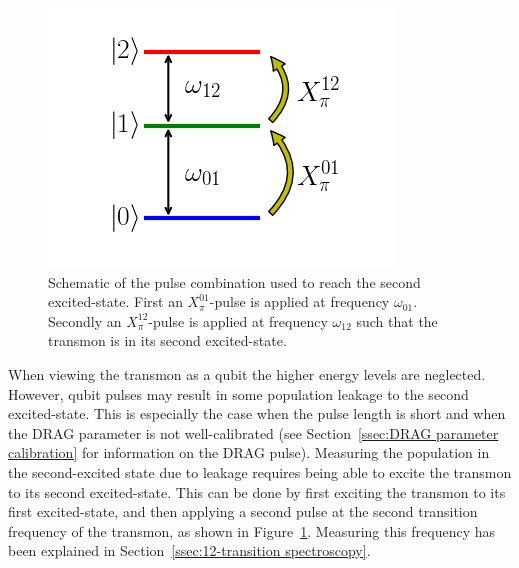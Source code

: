         \begin{figure}
          \begin{center}
          \vspace{-30pt}
            \includegraphics[width=\textwidth]{../Figures/Exploring frequency re-use/schematic second transition pulsing.png}
          \end{center}
          \vspace{-20 pt}
          \caption{Schematic of the pulse combination used to reach the second excited-state. First an $X_\pi^{01}$-pulse is applied at frequency $\omega_{01}$. Secondly an $X_\pi^{12}$-pulse is applied at frequency $\omega_{12}$ such that the transmon is in its second excited-state.}
          \label{fig:schematic pulsing to second excited-state}
        \end{figure}

        When viewing the transmon as a qubit the higher energy levels are neglected. However, qubit pulses may result in some population leakage to the second excited-state. This is especially the case when the pulse length is short and when the DRAG parameter is not well-calibrated (see Section~\ref{ssec:DRAG parameter calibration} for information on the DRAG pulse). Measuring the population in the second-excited state due to leakage requires being able to excite the transmon to its second excited-state. This can be done by first exciting the transmon to its first excited-state, and then applying a second pulse at the second transition frequency of the transmon, as shown in Figure~\ref{fig:schematic pulsing to second excited-state}. Measuring this frequency has been explained in Section~\ref{ssec:12-transition spectroscopy}.

